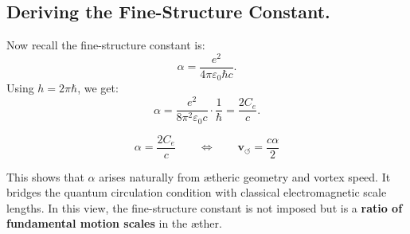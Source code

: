 \subsection{Deriving the Fine-Structure Constant.}
Now recall the fine-structure constant is:
\begin{equation*}
    \alpha = \frac{e^2}{4 \pi \varepsilon_0 \hbar c}.
\end{equation*}
Using \( h = 2\pi \hbar \), we get:
\begin{equation*}
    \alpha = \frac{e^2}{8 \pi^2 \varepsilon_0 c} \cdot \frac{1}{\hbar} = \frac{2 C_e}{c}.
\end{equation*}

\begin{equation}
    \boxed{
        \alpha = \frac{2 C_e}{c}
    }
    \qquad \Leftrightarrow \qquad
    \boxed{
        \mathbf{v}_{\scriptscriptstyle\boldsymbol{\circlearrowleft}} = \frac{c \alpha}{2}
    }
\end{equation}

This shows that \( \alpha \) arises naturally from ætheric geometry and vortex speed. It bridges the quantum circulation condition with classical electromagnetic scale lengths. In this view, the fine-structure constant is not imposed but is a \textbf{ratio of fundamental motion scales} in the æther.
